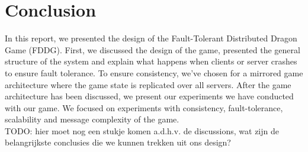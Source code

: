 \section{Conclusion}
In this report, we presented the design of the Fault-Tolerant Distributed Dragon Game (FDDG). First, we discussed the design of the game, presented the general structure of the system and explain what happens when clients or server crashes to ensure fault tolerance. To ensure consistency, we've chosen for a mirrored game architecture where the game state is replicated over all servers. After the game architecture has been discussed, we present our experiments we have conducted with our game. We focused on experiments with consistency, fault-tolerance, scalability and message complexity of the game.\\
TODO: hier moet nog een stukje komen a.d.h.v. de discussions, wat zijn de belangrijkste conclusies die we kunnen trekken uit ons design?